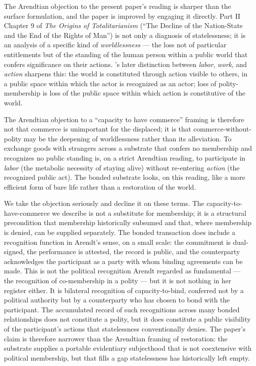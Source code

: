 \documentclass[11pt,a4paper]{article}
\theoremstyle{remark}
\begin{document}
The Arendtian objection to the present paper's reading is sharper
than the surface formulation, and the paper is improved by
engaging it directly. Part II Chapter 9 of \emph{The Origins of
Totalitarianism} (``The Decline of the Nation-State and the End
of the Rights of Man'') is not only a diagnosis of statelessness;
it is an analysis of a specific kind of \emph{worldlessness} --- the
loss not of particular entitlements but of the standing of the
human person within a public world that confers significance on
their actions. \citet{arendt1958human}'s later distinction
between \emph{labor}, \emph{work}, and \emph{action} sharpens
this: the world is constituted through action visible to others,
in a public space within which the actor is recognized as an
actor; loss of polity-membership is loss of the public space
within which action is constitutive of the world.

The Arendtian objection to a ``capacity to have commerce''
framing is therefore not that commerce is unimportant for the
displaced; it is that commerce-without-polity may be the
deepening of worldlessness rather than its alleviation. To
exchange goods with strangers across a substrate that confers no
membership and recognizes no public standing is, on a strict
Arendtian reading, to participate in \emph{labor} (the metabolic
necessity of staying alive) without re-entering \emph{action}
(the recognized public act). The bonded substrate looks, on this
reading, like a more efficient form of bare life rather than a
restoration of the world.

We take the objection seriously and decline it on these terms.
The capacity-to-have-commerce we describe is not a substitute
for membership; it is a structural precondition that membership
historically subsumed and that, where membership is denied, can
be supplied separately. The bonded transaction does include a
recognition function in Arendt's sense, on a small scale: the
commitment is dual-signed, the performance is attested, the
record is public, and the counterparty acknowledges the
participant as a party with whom binding agreements can be made.
This is not the political recognition Arendt regarded as
fundamental --- the recognition of co-membership in a polity ---
but it is not nothing in her register either. It is bilateral
recognition of capacity-to-bind, conferred not by a political
authority but by a counterparty who has chosen to bond with the
participant. The accumulated record of such recognitions across
many bonded relationships does not constitute a polity, but it
does constitute a public visibility of the participant's actions
that statelessness conventionally denies. The paper's claim is
therefore narrower than the Arendtian framing of restoration:
the substrate supplies a portable evidentiary subjecthood that
is not coextensive with political membership, but that fills a
gap statelessness has historically left empty.
\end{document}
